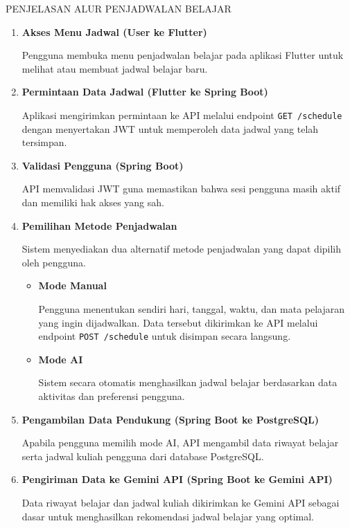 \documentclass[11pt]{article}
\begin{document}
PENJELASAN ALUR PENJADWALAN BELAJAR

\begin{enumerate}

\item \textbf{Akses Menu Jadwal (User ke Flutter)}

Pengguna membuka menu penjadwalan belajar pada aplikasi Flutter untuk melihat atau membuat jadwal belajar baru.

\item \textbf{Permintaan Data Jadwal (Flutter ke Spring Boot)}

Aplikasi mengirimkan permintaan ke API melalui endpoint \texttt{GET /schedule} dengan menyertakan JWT untuk memperoleh data jadwal yang telah tersimpan.

\item \textbf{Validasi Pengguna (Spring Boot)}

API memvalidasi JWT guna memastikan bahwa sesi pengguna masih aktif dan memiliki hak akses yang sah.

\item \textbf{Pemilihan Metode Penjadwalan}

Sistem menyediakan dua alternatif metode penjadwalan yang dapat dipilih oleh pengguna.

\begin{itemize}

\item \textbf{Mode Manual}

Pengguna menentukan sendiri hari, tanggal, waktu, dan mata pelajaran yang ingin dijadwalkan. Data tersebut dikirimkan ke API melalui endpoint \texttt{POST /schedule} untuk disimpan secara langsung.

\item \textbf{Mode AI}

Sistem secara otomatis menghasilkan jadwal belajar berdasarkan data aktivitas dan preferensi pengguna.

\end{itemize}

\item \textbf{Pengambilan Data Pendukung (Spring Boot ke PostgreSQL)}

Apabila pengguna memilih mode AI, API mengambil data riwayat belajar serta jadwal kuliah pengguna dari database PostgreSQL.

\item \textbf{Pengiriman Data ke Gemini API (Spring Boot ke Gemini API)}

Data riwayat belajar dan jadwal kuliah dikirimkan ke Gemini API sebagai dasar untuk menghasilkan rekomendasi jadwal belajar yang optimal.


\end{enumerate}
\end{document}
